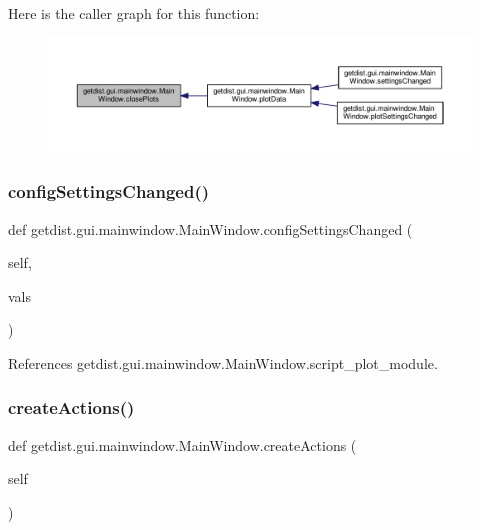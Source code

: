 Here is the caller graph for this function\+:
\nopagebreak
\begin{figure}[H]
\begin{center}
\leavevmode
\includegraphics[width=350pt]{classgetdist_1_1gui_1_1mainwindow_1_1MainWindow_a149bcf1e24828e673910fe008a7e458d_icgraph}
\end{center}
\end{figure}
\mbox{\label{classgetdist_1_1gui_1_1mainwindow_1_1MainWindow_aa3137337c73a0bfeb5a754e3a418797e}} 
\subsubsection{\texorpdfstring{config\+Settings\+Changed()}{configSettingsChanged()}}
{\footnotesize\ttfamily def getdist.\+gui.\+mainwindow.\+Main\+Window.\+config\+Settings\+Changed (\begin{DoxyParamCaption}\item[{}]{self,  }\item[{}]{vals }\end{DoxyParamCaption})}



References getdist.\+gui.\+mainwindow.\+Main\+Window.\+script\+\_\+plot\+\_\+module.

\mbox{\label{classgetdist_1_1gui_1_1mainwindow_1_1MainWindow_aa9bbbc91470ed6644800cb8703ebae4c}} 
\subsubsection{\texorpdfstring{create\+Actions()}{createActions()}}
{\footnotesize\ttfamily def getdist.\+gui.\+mainwindow.\+Main\+Window.\+create\+Actions (\begin{DoxyParamCaption}\item[{}]{self }\end{DoxyParamCaption})}

